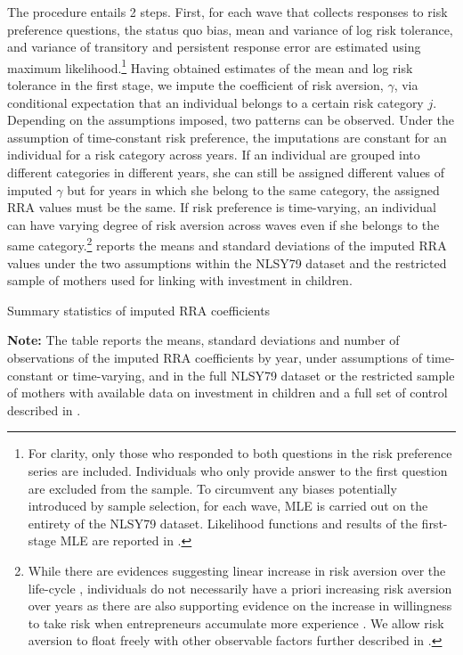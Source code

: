 \documentclass[emulatestandardclasses, 10pt, abstract = true]{scrartcl}
\begin{document}
The procedure entails 2 steps. First, for each wave that collects responses to risk preference questions, the status quo bias, mean and variance of log risk tolerance, and variance of transitory and persistent response error are estimated using maximum likelihood.\footnote{For clarity, only those who responded to both questions in the risk preference series are included. Individuals who only provide answer to the first question are excluded from the sample. To circumvent any biases potentially introduced by sample selection, for each wave, MLE is carried out on the entirety of the NLSY79 dataset. Likelihood functions and results of the first-stage MLE are reported in .} Having obtained estimates of the mean and log risk tolerance in the first stage, we impute the coefficient of risk aversion, $\gamma$, via conditional expectation that an individual belongs to a certain risk category $j$. Depending on the assumptions imposed, two patterns can be observed. Under the assumption of time-constant risk preference, the imputations are constant for an individual for a risk category across years. If an individual are grouped into different categories in different years, she can still be assigned different values of imputed $\gamma$ but for years in which she belong to the same category, the assigned RRA values must be the same. If risk preference is time-varying, an individual can have varying degree of risk aversion across waves even if she belongs to the same category.\footnote{While there are evidences suggesting linear increase in risk aversion over the life-cycle \citep{dohmen2017risk}, individuals do not necessarily have a priori increasing risk aversion over years as there are also supporting evidence on the increase in willingness to take risk when entrepreneurs accumulate more experience  \citep{brachert2017simultaneity,cho2021endogenous}. We allow risk aversion to float freely with other observable factors further described in .}  reports the means and standard deviations of the imputed RRA values under the two assumptions within the NLSY79 dataset and the restricted sample of mothers used for linking with investment in children.

\begin{table}
	\centering
	\setlength{\extrarowheight}{0.3em}
	\begin{threeparttable}
		\caption{Summary statistics of imputed RRA coefficients}	
		
		\label{table:CRRA-summary}
	\begin{tablenotes}[flushleft]\footnotesize
		\item \textbf{Note:} The table reports the means, standard deviations and number of observations of the imputed RRA coefficients by year, under assumptions of time-constant or time-varying, and in the full NLSY79 dataset or the restricted sample of mothers with available data on investment in children and a full set of control described in .
	\end{tablenotes}
	\end{threeparttable}
\end{table}    
\end{document}
